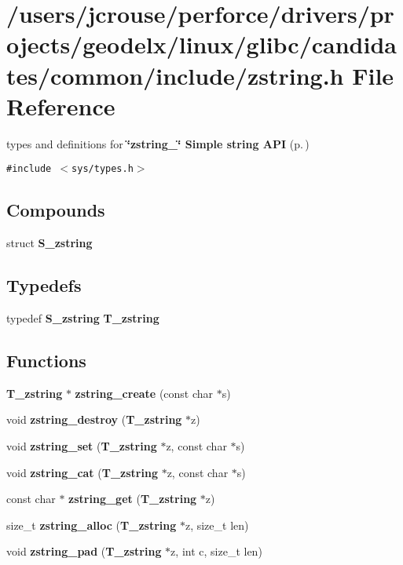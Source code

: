 \section{/users/jcrouse/perforce/drivers/projects/geodelx/linux/glibc/candidates/common/include/zstring.h File Reference}
\label{zstring_8h}
types and definitions for {\bf \char`\"{}zstring\_\-\char`\"{} Simple string API} {\rm (p.\,\pageref{group__zstring})} 


{\tt \#include $<$sys/types.h$>$}\par
\subsection*{Compounds}
\begin{CompactItemize}
\item 
struct {\bf S\_\-zstring}
\end{CompactItemize}
\subsection*{Typedefs}
\begin{CompactItemize}
\item 
typedef {\bf S\_\-zstring} {\bf T\_\-zstring}
\end{CompactItemize}
\subsection*{Functions}
\begin{CompactItemize}
\item 
{\bf T\_\-zstring} $\ast$ {\bf zstring\_\-create} (const char $\ast$s)
\item 
void {\bf zstring\_\-destroy} ({\bf T\_\-zstring} $\ast$z)
\item 
void {\bf zstring\_\-set} ({\bf T\_\-zstring} $\ast$z, const char $\ast$s)
\item 
void {\bf zstring\_\-cat} ({\bf T\_\-zstring} $\ast$z, const char $\ast$s)
\item 
const char $\ast$ {\bf zstring\_\-get} ({\bf T\_\-zstring} $\ast$z)
\item 
size\_\-t {\bf zstring\_\-alloc} ({\bf T\_\-zstring} $\ast$z, size\_\-t len)
\item 
void {\bf zstring\_\-pad} ({\bf T\_\-zstring} $\ast$z, int c, size\_\-t len)
\end{CompactItemize}


